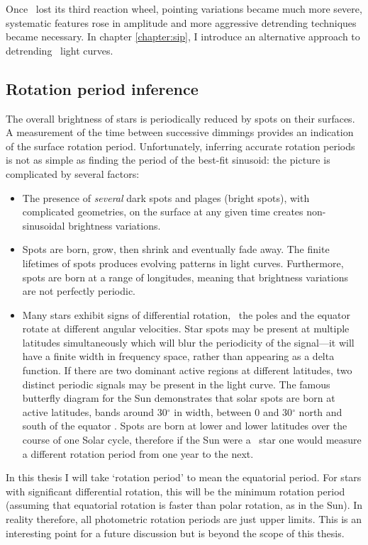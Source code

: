 Once \kepler\ lost its third reaction wheel, pointing variations became much
more severe, systematic features rose in amplitude and more aggressive
detrending techniques became necessary.
In chapter \ref{chapter:sip}, I introduce an alternative approach to
detrending \ktwo\ light curves.

\subsection{Rotation period inference}
The overall brightness of stars is periodically reduced by spots on their
surfaces.
A measurement of the time between successive dimmings provides an indication
of the surface rotation period.
Unfortunately, inferring accurate rotation periods is not as simple as finding
the period of the best-fit sinusoid: the picture is complicated by several
factors:
\begin{itemize}
\item{The presence of {\it several} dark spots and plages (bright spots), with
complicated geometries, on the surface at any given time creates
non-sinusoidal brightness variations.}
\item{Spots are born, grow, then shrink and eventually fade away.
The finite lifetimes of spots produces evolving patterns in light curves.
Furthermore, spots are born at a range of longitudes, meaning that brightness
variations are not perfectly periodic.}
\item{Many stars exhibit signs of differential rotation, \ie\ the poles and
the equator rotate at different angular velocities.
Star spots may be present at multiple latitudes simultaneously which will blur
the periodicity of the signal---it will have a finite width in frequency
space, rather than appearing as a delta function.
If there are two dominant active regions at different latitudes, two distinct
periodic signals may be present in the light curve.
The famous butterfly diagram for the Sun demonstrates that solar spots are
born at active latitudes, bands around 30$^\circ$ in width, between 0 and
30$^\circ$ north and south of the equator \citep[\eg][]{Charbonneau2010}.
Spots are born at lower and lower latitudes over the course of one Solar
cycle, therefore if the Sun were a \kepler\
star one would measure a different rotation period from one year to the next.
}
\end{itemize}

In this thesis I will take `rotation period' to mean the equatorial period.
For stars with significant differential rotation, this will be the minimum
rotation period (assuming that equatorial rotation is faster than polar
rotation, as in the Sun).
In reality therefore, all photometric rotation periods are just upper limits.
This is an interesting point for a future discussion but is beyond the scope
of this thesis.

